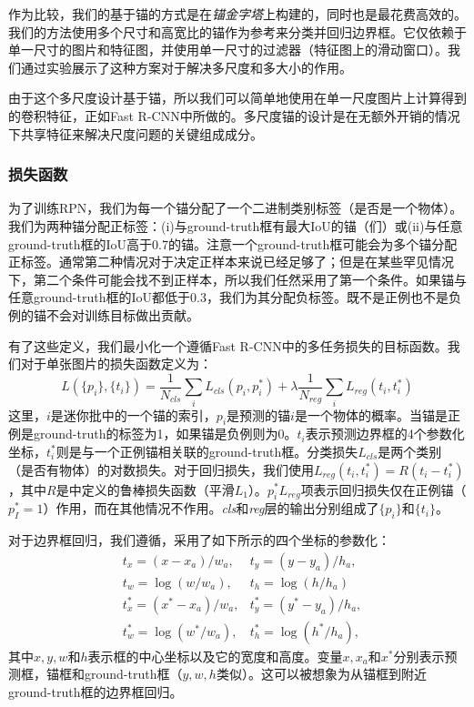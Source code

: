 \documentclass[../main.tex]{subfile}
\begin{document}
作为比较，我们的基于锚的方式是在\textit{锚金字塔}上构建的，同时也是最花费高效的。我们的方法使用多个尺寸和高宽比的锚作为参考来分类并回归边界框。它仅依赖于单一尺寸的图片和特征图，并使用单一尺寸的过滤器（特征图上的滑动窗口）。我们通过实验展示了这种方案对于解决多尺度和多大小的作用。

由于这个多尺度设计基于锚，所以我们可以简单地使用在单一尺度图片上计算得到的卷积特征，正如Fast R-CNN\cite{fastrcnn}中所做的。多尺度锚的设计是在无额外开销的情况下共享特征来解决尺度问题的关键组成成分。

\subsubsection{损失函数}

为了训练RPN，我们为每一个锚分配了一个二进制类别标签（是否是一个物体）。我们为两种锚分配正标签：(i)与ground-truth框有最大IoU的锚（们）或(ii)与任意ground-truth框的IoU高于0.7的锚。注意一个ground-truth框可能会为多个锚分配正标签。通常第二种情况对于决定正样本来说已经足够了；但是在某些罕见情况下，第二个条件可能会找不到正样本，所以我们任然采用了第一个条件。如果锚与任意ground-truth框的IoU都低于0.3，我们为其分配负标签。既不是正例也不是负例的锚不会对训练目标做出贡献。

有了这些定义，我们最小化一个遵循Fast R-CNN\cite{fastrcnn}中的多任务损失的目标函数。我们对于单张图片的损失函数定义为：
\begin{equation}
    L(\{p_i\}, \{t_i\}) = \frac{1}{N_{cls}}\sum_i L_{cls}(p_i, p_i^*) + \lambda \frac{1}{N_{reg}}\sum_i L_{reg}(t_i, t_i^*)
\end{equation}
这里，$i$是迷你批中的一个锚的索引，$p_i$是预测的锚$i$是一个物体的概率。当锚是正例是ground-truth的标签为1，如果锚是负例则为0。$t_i$表示预测边界框的4个参数化坐标，$t_i^*$则是与一个正例锚相关联的ground-truth框。分类损失$L_{cls}$是两个类别（是否有物体）的对数损失。对于回归损失，我们使用$L_{reg}(t_i, t_i^*)=R(t_i-t_i^*)$，其中$R$是\cite{fastrcnn}中定义的鲁棒损失函数（平滑$L_1$）。$p_i^*L_{reg}$项表示回归损失仅在正例锚（$p_I^*=1$）作用，而在其他情况不作用。\textit{cls}和\textit{reg}层的输出分别组成了$\{p_i\}$和$\{t_i\}$。

对于边界框回归，我们遵循\cite{rcnn}，采用了如下所示的四个坐标的参数化：
\begin{equation}
    \begin{aligned}
         & t_x = (x - x_a) / w_a,     & t_y = (y - y_a) / h_a,     \\
         & t_w = \log(w/w_a),         & t_h = \log(h/h_a)          \\
         & t_x^* = (x^* - x_a) / w_a, & t_y^* = (y^* - y_a) / h_a, \\
         & t_w^* = \log(w^*/w_a),     & t_h^* = \log(h^*/h_a),
    \end{aligned}
\end{equation}
其中$x, y, w$和$h$表示框的中心坐标以及它的宽度和高度。变量$x, x_a$和$x^*$分别表示预测框，锚框和ground-truth框（$y,w,h$类似）。这可以被想象为从锚框到附近ground-truth框的边界框回归。
\end{document}
